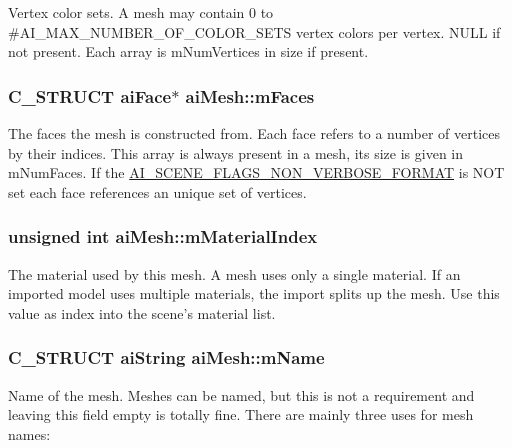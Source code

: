 Vertex color sets. A mesh may contain 0 to \#\-A\-I\-\_\-\-M\-A\-X\-\_\-\-N\-U\-M\-B\-E\-R\-\_\-\-O\-F\-\_\-\-C\-O\-L\-O\-R\-\_\-\-S\-E\-T\-S vertex colors per vertex. N\-U\-L\-L if not present. Each array is m\-Num\-Vertices in size if present. \hypertarget{structai_mesh_a5a65fbc7fdea7f8d36f39047425ece07}{
\subsubsection[{m\-Faces}]{\setlength{\rightskip}{0pt plus 5cm}C\-\_\-\-S\-T\-R\-U\-C\-T {\bf ai\-Face}$\ast$ ai\-Mesh\-::m\-Faces}}\label{structai_mesh_a5a65fbc7fdea7f8d36f39047425ece07}
The faces the mesh is constructed from. Each face refers to a number of vertices by their indices. This array is always present in a mesh, its size is given in m\-Num\-Faces. If the \hyperlink{scene_8h_ae17f4a0adb51e554db9575cc4e1126f9}{A\-I\-\_\-\-S\-C\-E\-N\-E\-\_\-\-F\-L\-A\-G\-S\-\_\-\-N\-O\-N\-\_\-\-V\-E\-R\-B\-O\-S\-E\-\_\-\-F\-O\-R\-M\-A\-T} is N\-O\-T set each face references an unique set of vertices. \hypertarget{structai_mesh_aa2807c7ba172115203ed16047ad65f9e}{
\subsubsection[{m\-Material\-Index}]{\setlength{\rightskip}{0pt plus 5cm}unsigned int ai\-Mesh\-::m\-Material\-Index}}\label{structai_mesh_aa2807c7ba172115203ed16047ad65f9e}
The material used by this mesh. A mesh uses only a single material. If an imported model uses multiple materials, the import splits up the mesh. Use this value as index into the scene's material list. \hypertarget{structai_mesh_a8dd9433e0c5b008e3e5aee6c801d3b74}{
\subsubsection[{m\-Name}]{\setlength{\rightskip}{0pt plus 5cm}C\-\_\-\-S\-T\-R\-U\-C\-T {\bf ai\-String} ai\-Mesh\-::m\-Name}}\label{structai_mesh_a8dd9433e0c5b008e3e5aee6c801d3b74}
Name of the mesh. Meshes can be named, but this is not a requirement and leaving this field empty is totally fine. There are mainly three uses for mesh names\-:
